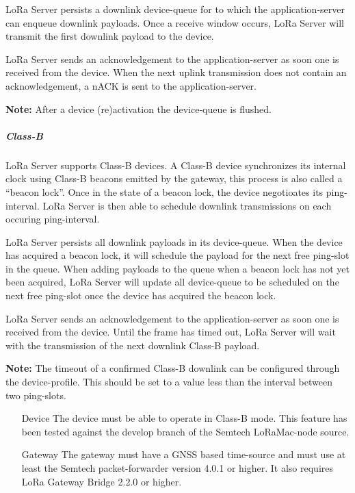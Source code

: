 LoRa Server persists a downlink device-queue for to which the application-server can enqueue downlink payloads.
Once a receive window occurs,
	LoRa Server will transmit the first downlink payload to the device.

LoRa Server sends an acknowledgement to the application-server as soon one is received from the device.
When the next uplink transmission does not contain an acknowledgement,
	a nACK is sent to the application-server.

\textbf{Note:}
	After a device (re)activation the device-queue is flushed.




\subparagraph{Class-B}
LoRa Server supports Class-B devices.
A Class-B device synchronizes its internal clock using Class-B beacons emitted by the gateway,
	this process is also called a “beacon lock”.
Once in the state of a beacon lock,
	the device negotioates its ping-interval.
LoRa Server is then able to schedule downlink transmissions on each occuring ping-interval.

LoRa Server persists all downlink payloads in its device-queue.
When the device has acquired a beacon lock,
	it will schedule the payload for the next free ping-slot in the queue.
When adding payloads to the queue when a beacon lock has not yet been acquired,
	LoRa Server will update all device-queue to be scheduled on the next free ping-slot once the device has acquired the beacon lock.

LoRa Server sends an acknowledgement to the application-server as soon one is received from the device.
Until the frame has timed out,
	LoRa Server will wait with the transmission of the next downlink Class-B payload.

\textbf{Note:} The timeout of a confirmed Class-B downlink can be configured through the device-profile.
This should be set to a value less than the interval between two ping-slots.


\begin{itemize}
	\item[Device]
	The device must be able to operate in Class-B mode.
This feature has been tested against the develop branch of the Semtech LoRaMac-node source.
	\item[Gateway]
	The gateway must have a GNSS based time-source and must use at least the Semtech packet-forwarder version 4.0.1 or higher.
It also requires LoRa Gateway Bridge 2.2.0 or higher.

\end{itemize}


